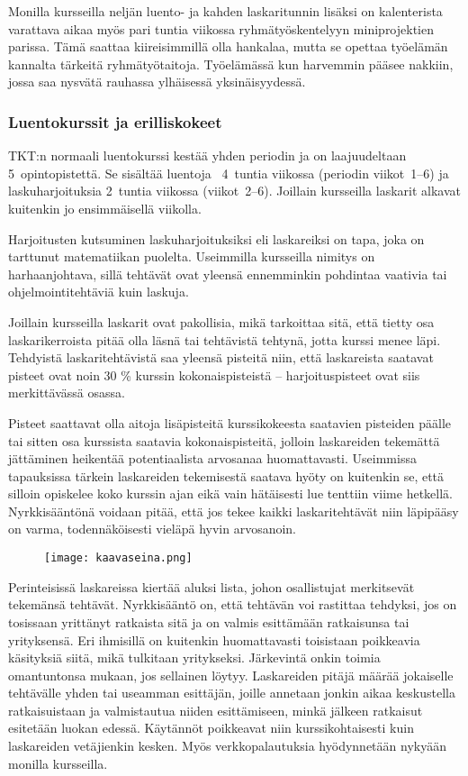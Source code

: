 \documentclass[../ala_hataile.tex]{subfiles}
\begin{document}
	Monilla kursseilla neljän luento-
	ja kahden laskaritunnin lisäksi on 
	kalenterista varattava aikaa myös
	pari tuntia viikossa ryhmätyöskentelyyn 
	miniprojektien parissa. Tämä saattaa 
	kiireisimmillä olla hankalaa, mutta se 
	opettaa työelämän kannalta tärkeitä ryhmätyötaitoja.
	Työelämässä kun harvemmin pääsee
	nakkiin, jossa saa nysvätä rauhassa ylhäisessä
	yksinäisyydessä.
	
	\subsubsection*{Luentokurssit ja erilliskokeet}
	TKT:n normaali luentokurssi kestää
	yhden periodin ja on laajuudeltaan 5~opintopistettä. Se sisältää luentoja ~4~tuntia
	viikossa (periodin viikot~1--6) ja laskuharjoituksia
	2~tuntia viikossa (viikot~2--6). Joillain kursseilla 
	laskarit alkavat kuitenkin jo ensimmäisellä viikolla.
	
	Harjoitusten kutsuminen laskuharjoituksiksi
	eli laskareiksi on tapa, joka on tarttunut
	matematiikan puolelta. Useimmilla
	kursseilla nimitys on harhaanjohtava, sillä
	tehtävät ovat yleensä ennemminkin pohdintaa
	vaativia tai ohjelmointitehtäviä kuin
	laskuja.
	
	Joillain kursseilla laskarit ovat pakollisia,
	mikä tarkoittaa sitä, että tietty osa laskarikerroista
	pitää olla läsnä tai tehtävistä
	tehtynä, jotta kurssi menee läpi. Tehdyistä
	laskaritehtävistä saa yleensä pisteitä niin,
	että laskareista saatavat pisteet ovat noin
	30 \% kurssin kokonaispisteistä -- harjoituspisteet
	ovat siis merkittävässä osassa.
	
	Pisteet saattavat olla aitoja lisäpisteitä
	kurssikokeesta saatavien pisteiden päälle
	tai sitten osa kurssista saatavia kokonaispisteitä,
	jolloin laskareiden tekemättä jättäminen
	heikentää potentiaalista arvosanaa
	huomattavasti. Useimmissa tapauksissa
	tärkein laskareiden tekemisestä saatava
	hyöty on kuitenkin se, että silloin opiskelee
	koko kurssin ajan eikä vain hätäisesti
	lue tenttiin viime hetkellä. Nyrkkisääntönä
	voidaan pitää, että jos tekee kaikki laskaritehtävät
	niin läpipääsy on varma, todennäköisesti
	vieläpä hyvin arvosanoin.
	\begin{figure}[b]
		\centering
		\texttt{[image: kaavaseina.png]}
	\end{figure}
	
	Perinteisissä laskareissa kiertää aluksi
	lista, johon osallistujat merkitsevät tekemänsä
	tehtävät. Nyrkkisääntö on, että
	tehtävän voi rastittaa tehdyksi, jos on tosissaan
	yrittänyt ratkaista sitä ja on valmis
	esittämään ratkaisunsa tai yrityksensä.
	Eri ihmisillä on kuitenkin huomattavasti toisistaan
	poikkeavia käsityksiä siitä, mikä tulkitaan
	yritykseksi. Järkevintä onkin toimia
	omantuntonsa mukaan, jos sellainen löytyy.
	Laskareiden pitäjä määrää jokaiselle
	tehtävälle yhden tai useamman esittäjän,
	joille annetaan jonkin aikaa keskustella
	ratkaisuistaan ja valmistautua niiden esittämiseen,
	minkä jälkeen ratkaisut esitetään
	luokan edessä. Käytännöt poikkeavat niin
	kurssikohtaisesti kuin laskareiden vetäjienkin
	kesken. Myös verkkopalautuksia hyödynnetään nykyään monilla kursseilla.
	
\end{document}
